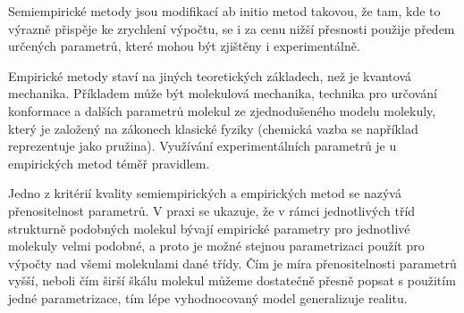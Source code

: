 \documentclass[10pt,draft,oneside]{fithesis2}
\newcommand\todo[1]{\textcolor{red}{[[#1]]}}
\renewcommand\todo[1]{}
\begin{document}
Semiempirické metody jsou modifikací ab initio metod takovou, že tam, kde to výrazně přispěje ke zrychlení výpočtu, se i za cenu nižší přesnosti použije předem určených parametrů, které mohou být zjištěny i experimentálně.

Empirické metody staví na jiných teoretických základech, než je kvantová mechanika. Příkladem může být molekulová mechanika, technika pro určování konformace a dalších parametrů molekul ze zjednodušeného modelu molekuly, který je založený na zákonech klasické fyziky (chemická vazba se například reprezentuje jako pružina). Využívání experimentálních parametrů je u empirických metod téměř pravidlem.

Jedno z kritérií kvality semiempirických a empirických metod se nazývá přenositelnost parametrů. V praxi se ukazuje, že v rámci jednotlivých tříd strukturně podobných molekul bývají empirické parametry pro jednotlivé molekuly velmi podobné, a proto je možné stejnou parametrizaci použít pro výpočty nad všemi molekulami dané třídy. Čím je míra přenositelnosti parametrů vyšší, neboli čím širší škálu molekul můžeme dostatečně přesně popsat s použitím jedné parametrizace, tím lépe vyhodnocovaný model generalizuje realitu.





\todo{proč počítat parcialní náboje}


\end{document}
